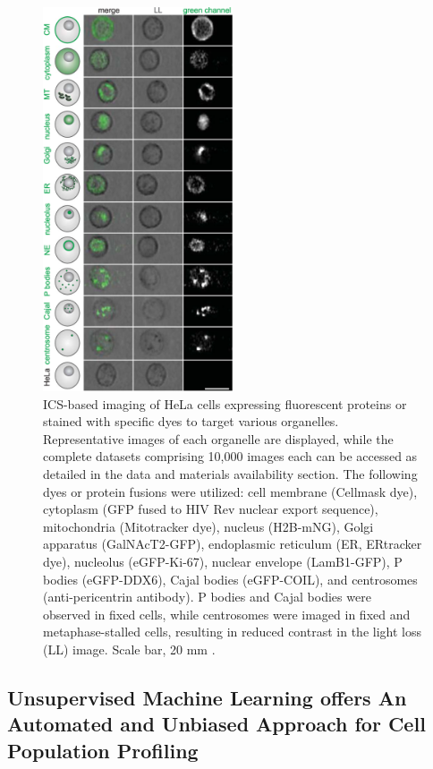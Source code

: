 \documentclass[12pt,a4paper]{article}
\begin{document}
\begin{figure}
  \centering
  \includegraphics[width=0.5\textwidth]{Figures/ImagingICS.png}
  \caption{ICS-based imaging of HeLa cells expressing fluorescent proteins or stained with specific dyes to target various organelles. Representative images of each organelle are displayed, while the complete datasets comprising 10,000 images each can be accessed as detailed in the data and materials availability section. The following dyes or protein fusions were utilized: cell membrane (Cellmask dye), cytoplasm (GFP fused to HIV Rev nuclear export sequence), mitochondria (Mitotracker dye), nucleus (H2B-mNG), Golgi apparatus (GalNAcT2-GFP), endoplasmic reticulum (ER, ERtracker dye), nucleolus (eGFP-Ki-67), nuclear envelope (LamB1-GFP), P bodies (eGFP-DDX6), Cajal bodies (eGFP-COIL), and centrosomes (anti-pericentrin antibody). P bodies and Cajal bodies were observed in fixed cells, while centrosomes were imaged in fixed and metaphase-stalled cells, resulting in reduced contrast in the light loss (LL) image. Scale bar, 20 mm \cite{doi:10.1126/science.abj3013}.}
  \label{icsimaging}
\end{figure}

\subsection{Unsupervised Machine Learning offers An Automated and Unbiased Approach for Cell Population Profiling}
\end{document}
